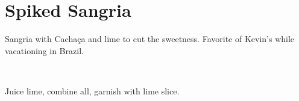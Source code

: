 \section[Spiked Sangria]{Spiked Sangria~}


\begin{recipestats}[
	servings=1,
	preptime=5~\minute,
	original=Kevin Green,
]
\end{recipestats}


\begin{recipeabstract}
	Sangria with Cacha\c{c}a and lime to cut the sweetness.
	Favorite of Kevin's while vacationing in Brazil.
\end{recipeabstract}


\begin{ingredientcolumns}
	\begin{ingredientblock}
		\\
	\end{ingredientblock}
	\begin{ingredientblock}
		\ingredient[1][wedge]{lime}
	\end{ingredientblock}
\end{ingredientcolumns}


\begin{preparation}
\item Juice lime, combine all, garnish with lime slice.
\end{preparation}


\recipeend%
